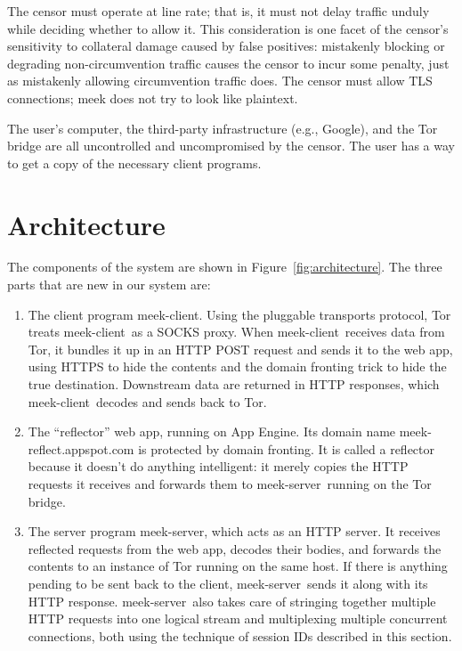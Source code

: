 \documentclass{article}
\def\meekclient{\mbox{meek-client}}
\def\meekserver{\mbox{meek-server}}
\begin{document}
The censor must operate at line rate; that is,
it must not delay traffic unduly while deciding whether to allow it.
This consideration is one facet of the censor's sensitivity to
collateral damage caused by false positives:
mistakenly blocking or degrading non-circumvention traffic causes the censor
to incur some penalty, just as mistakenly allowing circumvention traffic does.
The censor must allow TLS connections; meek does not try to look like plaintext.

The user's computer, the third-party infrastructure (e.g., Google), and the Tor bridge
are all uncontrolled and uncompromised by the censor.
The user has a way to get a copy of the necessary client programs.

\section{Architecture}

The components of the system are shown in Figure~\ref{fig:architecture}.
The three parts that are new in our system are:
\begin{enumerate}
\item The client program \meekclient.
Using the pluggable transports protocol, Tor treats \meekclient\ as a SOCKS proxy.
When \meekclient\ receives data from Tor, it bundles it up in an HTTP POST
request and sends it to the web app,
using HTTPS to hide the contents and the domain fronting trick to hide the true destination.
Downstream data are returned in HTTP responses, which \meekclient\ decodes and sends back to Tor.
\item The ``reflector'' web app, running on App Engine.
Its domain name \mbox{meek-reflect.appspot.com} is protected by domain fronting.
It is called a reflector because it doesn't do anything intelligent:
it merely copies the HTTP requests it receives and forwards them
to \meekserver\ running on the Tor bridge.
\item The server program \meekserver, which acts as an HTTP server.
It receives reflected requests from the web app, decodes their bodies,
and forwards the contents to an instance of Tor running on the same host.
If there is anything pending to be sent back to the client,
\meekserver\ sends it along with its HTTP response.
\meekserver\ also takes care of stringing together multiple HTTP requests
into one logical stream and multiplexing multiple concurrent connections,
both using the technique of session IDs described in this section.
\end{enumerate}
\end{document}
